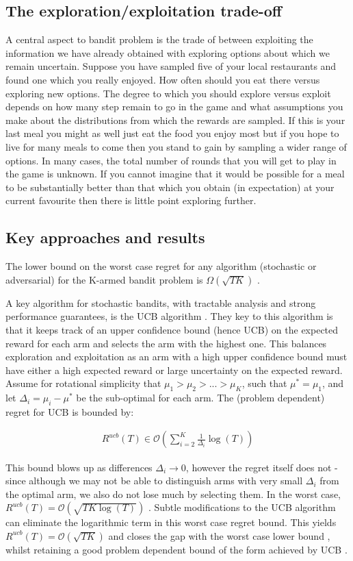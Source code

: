 \documentclass[11pt,a4paper,oneside]{book}
\newcommand{\eqn}[1]{\begin{align}#1\end{align}}
\newcommand{\bigo}[1]{\mathcal{O}\left( #1 \right)}
\newcommand{\bigomega}[1]{\Omega\left( #1 \right)}
\theoremstyle{plain}
\theoremstyle{definition}
\begin{document}
\subsection{The exploration/exploitation trade-off}
A central aspect to bandit problem is the trade of between exploiting the information we have already obtained with exploring options about which we remain uncertain. Suppose you have sampled five of your local restaurants and found one which you really enjoyed. How often should you eat there versus exploring new options. The degree to which you should explore versus exploit depends on how many step remain to go in the game and what assumptions you make about the distributions from which the rewards are sampled. If this is your last meal you might as well just eat the food you enjoy most but if you hope to live for many meals to come then you stand to gain by sampling a wider range of options. In many cases, the total number of rounds that you will get to play in the game is unknown. If you cannot imagine that it would be possible for a meal to be substantially better than that which you obtain (in expectation) at your current favourite then there is little point exploring further. 

\subsection{Key approaches and results}

The lower bound on the worst case regret for any algorithm (stochastic or adversarial) for the K-armed bandit problem is  $\bigomega{\sqrt{TK}}$ \cite{Auer1995}.

A key algorithm for stochastic bandits, with tractable analysis and strong performance guarantees, is the UCB algorithm \cite{Auer2002}. They key to this algorithm is that it keeps track of an upper confidence bound (hence UCB) on the expected reward for each arm and selects the arm with the highest one. This balances exploration and exploitation as an arm with a high upper confidence bound must have either a high expected reward or large uncertainty on the expected reward. Assume for rotational simplicity that $\mu_1 > \mu_2 > ... > \mu_K$, such that $\mu^* = \mu_1$, and let $\Delta_i = \mu_i - \mu^*$ be the sub-optimal for each arm. The (problem dependent) regret for UCB is bounded by: 

\eqn {
R^{ucb}(T) \in \bigo{\sum_{i=2}^K \frac{1}{\Delta_i}\log(T)}
}

This bound blows up as differences $\Delta_i \rightarrow 0$, however the regret itself does not - since although we may not be able to distinguish arms with very small $\Delta_i$ from the optimal arm, we also do not lose much by selecting them. In the worst case, $R^{ucb}(T) = \bigo{\sqrt{TK\log(T)}}$ \cite{Bubeck2012}. Subtle modifications to the UCB algorithm can eliminate the logarithmic term in this worst case regret bound. This yields $R^{ucb}(T) = \bigo{\sqrt{TK}}$ and closes the gap with the worst case lower bound \cite{Audibert2009,Lattimore2015}, whilst retaining a good problem dependent bound of the form achieved by UCB \cite{Lattimore2015}.
\end{document}
